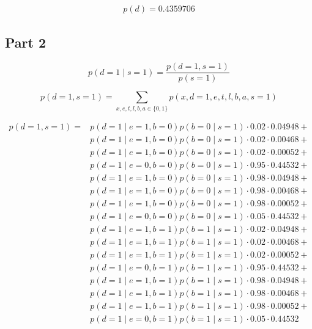 \documentclass[12pt]{report}
\begin{document}
\begin{align*}    
    p(d) = 0.4359706
\end{align*}


\subsection*{Part 2}

\begin{equation}\label{eq:P2_p2}
    p(d=1 \mid s = 1) = \frac{p(d=1 , s = 1)}{p(s=1)}
\end{equation}



\begin{equation}
    p(d=1 , s = 1) = \sum_{x,e,t,l,b,a \in \{0,1\}} p(x,d=1,e,t,l,b,a,s=1)
\end{equation}



\begin{align*}    
    p(d=1 , s = 1) = 
    &p(d=1\mid e=1,b=0)p(b=0\mid s=1) \cdot  0.02 \cdot 0.04948  + \\
    &p(d=1\mid e=1,b=0)p(b=0\mid s=1) \cdot  0.02 \cdot 0.00468  + \\
    &p(d=1\mid e=1,b=0)p(b=0\mid s=1) \cdot  0.02 \cdot 0.00052  + \\
    &p(d=1\mid e=0,b=0)p(b=0\mid s=1) \cdot  0.95 \cdot 0.44532  + \\
    &p(d=1\mid e=1,b=0)p(b=0\mid s=1) \cdot  0.98 \cdot 0.04948  + \\
    &p(d=1\mid e=1,b=0)p(b=0\mid s=1) \cdot  0.98 \cdot 0.00468  + \\
    &p(d=1\mid e=1,b=0)p(b=0\mid s=1) \cdot  0.98 \cdot 0.00052  + \\
    &p(d=1\mid e=0,b=0)p(b=0\mid s=1) \cdot  0.05 \cdot 0.44532  + \\  
    &p(d=1\mid e=1,b=1)p(b=1\mid s=1) \cdot  0.02 \cdot 0.04948  + \\
    &p(d=1\mid e=1,b=1)p(b=1\mid s=1) \cdot  0.02 \cdot 0.00468  + \\
    &p(d=1\mid e=1,b=1)p(b=1\mid s=1) \cdot  0.02 \cdot 0.00052  + \\
    &p(d=1\mid e=0,b=1)p(b=1\mid s=1) \cdot  0.95 \cdot 0.44532  + \\
    &p(d=1\mid e=1,b=1)p(b=1\mid s=1) \cdot  0.98 \cdot 0.04948  + \\
    &p(d=1\mid e=1,b=1)p(b=1\mid s=1) \cdot  0.98 \cdot 0.00468  + \\
    &p(d=1\mid e=1,b=1)p(b=1\mid s=1) \cdot  0.98 \cdot 0.00052  + \\
    &p(d=1\mid e=0,b=1)p(b=1\mid s=1) \cdot  0.05 \cdot 0.44532
\end{align*}
\end{document}
